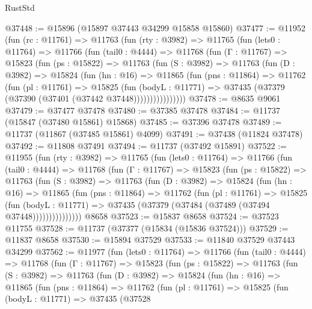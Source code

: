 \begin{lexlean}{RustStd}
\begin{coremodule}
@37448 := @15896 (@15897 @37443 @34299 @15858 @15860)
@37477 := @11952
    (fun (rc : @11761) =>
    @11763
      (fun (rty : @3982) =>
      @11765
        (fun (lets0 : @11764) =>
        @11766
          (fun (tail0 : @4444) =>
          @11768
            (fun (Γ : @11767) =>
            @15823
              (fun (ps : @15822) =>
              @11763
                (fun (S : @3982) =>
                @11763
                  (fun (D : @3982) =>
                  @15824
                    (fun (hn : @16) =>
                    @11865
                      (fun (pns : @11864) =>
                      @11762
                        (fun (pl : @11761) =>
                        @15825
                          (fun (bodyL : @11771) =>
                          @37435 (@37379 (@37390 (@37401 (@37442 @37448))))))))))))))))
@37478 := @8635 @9061
@37479 := @37477 @37478
@37480 := @37385 @37478
@37484 := @11737 (@15847 (@37480 @15861) @15868)
@37485 := @37396 @37478
@37489 := @11737 (@11867 (@37485 @15861) @4099)
@37491 := @37438 (@11824 @37478)
@37492 := @11808 @37491
@37494 := @11737 (@37492 @15891)
@37522 := @11955
    (fun (rty : @3982) =>
    @11765
      (fun (lets0 : @11764) =>
      @11766
        (fun (tail0 : @4444) =>
        @11768
          (fun (Γ : @11767) =>
          @15823
            (fun (ps : @15822) =>
            @11763
              (fun (S : @3982) =>
              @11763
                (fun (D : @3982) =>
                @15824
                  (fun (hn : @16) =>
                  @11865
                    (fun (pns : @11864) =>
                    @11762
                      (fun (pl : @11761) =>
                      @15825
                        (fun (bodyL : @11771) =>
                        @37435 (@37379 (@37484 (@37489 (@37494 @37448)))))))))))))))
    @8658
@37523 := @15837 @8658
@37524 := @37523 @11755
@37528 := @11737 (@37377 (@15834 (@15836 @37524)))
@37529 := @11837 @8658
@37530 := @15894 @37529
@37533 := @11840 @37529 @37443 @34299
@37562 := @11977
    (fun (lets0 : @11764) =>
    @11766
      (fun (tail0 : @4444) =>
      @11768
        (fun (Γ : @11767) =>
        @15823
          (fun (ps : @15822) =>
          @11763
            (fun (S : @3982) =>
            @11763
              (fun (D : @3982) =>
              @15824
                (fun (hn : @16) =>
                @11865
                  (fun (pns : @11864) =>
                  @11762
                    (fun (pl : @11761) =>
                    @15825
                      (fun (bodyL : @11771) =>
                      @37435
                        (@37528

\end{coremodule}
\end{lexlean}
